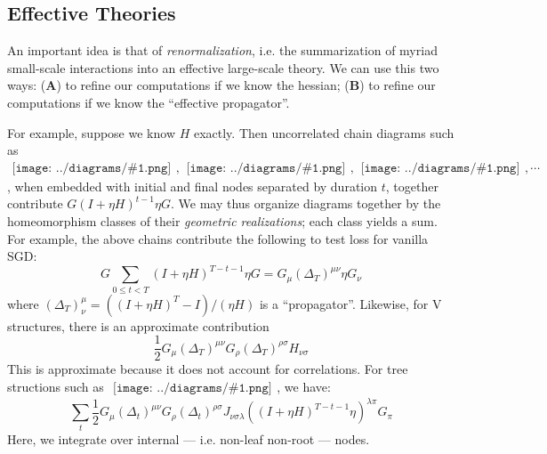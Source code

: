 \documentclass{article}
\newcommand{\sdia}[1]{\begin{gathered}\texttt{[image: ../diagrams/\#1.png]}\end{gathered}}
\begin{document}

    \subsection{Effective Theories}
        An important idea is that of \emph{renormalization}, i.e. the
        summarization of myriad small-scale interactions into an effective
        large-scale theory.  We can use this two ways: ({\bf A}) to refine our
        computations if we know the hessian;  ({\bf B}) to refine our
        computations if we know the ``effective propagator''.
        
        For example, suppose we know $H$ exactly.  Then uncorrelated chain
        diagrams such as $\sdia{(0-1)(01)}, \sdia{(0-1-2)(01-12)},
        \sdia{(0-1-2-3)(01-12-23)}, \cdots$, when embedded with initial and
        final nodes separated by duration $t$, together contribute $G (I+\eta
        H)^{t-1} \eta G$.  We may thus organize diagrams together by the
        homeomorphism classes of their \emph{geometric realizations}; each
        class yields a sum.  For example, the above chains contribute the
        following to test loss for vanilla SGD:
        \begin{equation}
            G \sum_{0\leq t<T} (I+\eta H)^{T-t-1} \eta G
            =
            G_\mu (\Delta_T)^{\mu\nu} \eta G_\nu
        \end{equation}
        where $(\Delta_T)^\mu_\nu = ((I+\eta H)^T - I)/(\eta H)$ is a
        ``propagator''.  Likewise, for V structures, there is an approximate
        contribution
        \begin{equation}
            \frac{1}{2} G_\mu (\Delta_T)^{\mu\nu} G_\rho (\Delta_T)^{\rho\sigma} H_{\nu\sigma}  
        \end{equation}
        This is approximate because it does not account for correlations.  For
        tree structions such as $\sdia{(0-1-2-3)(02-12-23)}$, we have:
        \begin{equation}
            \sum_t \frac{1}{2} G_\mu (\Delta_t)^{\mu\nu} G_\rho (\Delta_t)^{\rho\sigma}
                   J_{\nu\sigma\lambda} ((I+\eta H)^{T-t-1} \eta)^{\lambda\pi} G_\pi
        \end{equation}
        Here, we integrate over internal --- i.e. non-leaf non-root --- nodes.
    
\end{document}
